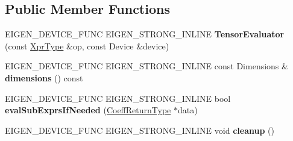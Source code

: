 \subsection*{Public Member Functions}
\begin{DoxyCompactItemize}
\item 
\mbox{\label{struct_eigen_1_1_tensor_evaluator_3_01const_01_tensor_reshaping_op_3_01_new_dimensions_00_01_arg_type_01_4_00_01_device_01_4_afe44c7c1cf33083363c9194e9d395b35}} 
E\+I\+G\+E\+N\+\_\+\+D\+E\+V\+I\+C\+E\+\_\+\+F\+U\+NC E\+I\+G\+E\+N\+\_\+\+S\+T\+R\+O\+N\+G\+\_\+\+I\+N\+L\+I\+NE {\bfseries Tensor\+Evaluator} (const \hyperlink{class_eigen_1_1_tensor_reshaping_op}{Xpr\+Type} \&op, const Device \&device)
\item 
\mbox{\label{struct_eigen_1_1_tensor_evaluator_3_01const_01_tensor_reshaping_op_3_01_new_dimensions_00_01_arg_type_01_4_00_01_device_01_4_a0aee2773899415c4b345ba268ad23fcf}} 
E\+I\+G\+E\+N\+\_\+\+D\+E\+V\+I\+C\+E\+\_\+\+F\+U\+NC E\+I\+G\+E\+N\+\_\+\+S\+T\+R\+O\+N\+G\+\_\+\+I\+N\+L\+I\+NE const Dimensions \& {\bfseries dimensions} () const
\item 
\mbox{\label{struct_eigen_1_1_tensor_evaluator_3_01const_01_tensor_reshaping_op_3_01_new_dimensions_00_01_arg_type_01_4_00_01_device_01_4_a0e58af050ae09be9f94922400f8df40c}} 
E\+I\+G\+E\+N\+\_\+\+D\+E\+V\+I\+C\+E\+\_\+\+F\+U\+NC E\+I\+G\+E\+N\+\_\+\+S\+T\+R\+O\+N\+G\+\_\+\+I\+N\+L\+I\+NE bool {\bfseries eval\+Sub\+Exprs\+If\+Needed} (\hyperlink{group___sparse_core___module}{Coeff\+Return\+Type} $\ast$data)
\item 
\mbox{\label{struct_eigen_1_1_tensor_evaluator_3_01const_01_tensor_reshaping_op_3_01_new_dimensions_00_01_arg_type_01_4_00_01_device_01_4_aaa790950c9e74082b6a3aaa6bcbceafc}} 
E\+I\+G\+E\+N\+\_\+\+D\+E\+V\+I\+C\+E\+\_\+\+F\+U\+NC E\+I\+G\+E\+N\+\_\+\+S\+T\+R\+O\+N\+G\+\_\+\+I\+N\+L\+I\+NE void {\bfseries cleanup} ()

\end{DoxyCompactItemize}
